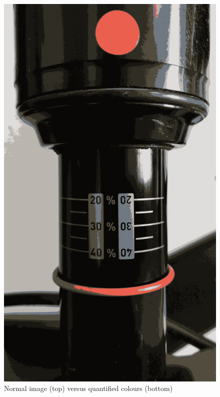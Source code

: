 \begin{figure}[h!]
			\includegraphics[scale=0.1,trim={0 140cm 0 0},clip]{../images/results/quant.jpg}
			\caption{Normal image (top) versus quantified colours (bottom)}
			\label{fig:quantified_colours}
		\end{figure}
